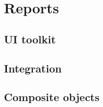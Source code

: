 \chapter{Reports}

\section{UI toolkit}



\section{Integration}


\section{Composite objects}


\graphicspath{ {../07-reports/} }


